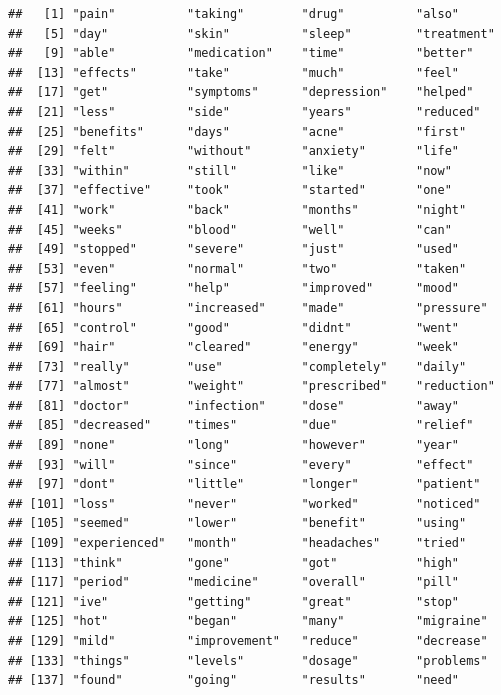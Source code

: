 \documentclass[spanish,]{article}
\begin{document}
\begin{verbatim}
##   [1] "pain"          "taking"        "drug"          "also"         
##   [5] "day"           "skin"          "sleep"         "treatment"    
##   [9] "able"          "medication"    "time"          "better"       
##  [13] "effects"       "take"          "much"          "feel"         
##  [17] "get"           "symptoms"      "depression"    "helped"       
##  [21] "less"          "side"          "years"         "reduced"      
##  [25] "benefits"      "days"          "acne"          "first"        
##  [29] "felt"          "without"       "anxiety"       "life"         
##  [33] "within"        "still"         "like"          "now"          
##  [37] "effective"     "took"          "started"       "one"          
##  [41] "work"          "back"          "months"        "night"        
##  [45] "weeks"         "blood"         "well"          "can"          
##  [49] "stopped"       "severe"        "just"          "used"         
##  [53] "even"          "normal"        "two"           "taken"        
##  [57] "feeling"       "help"          "improved"      "mood"         
##  [61] "hours"         "increased"     "made"          "pressure"     
##  [65] "control"       "good"          "didnt"         "went"         
##  [69] "hair"          "cleared"       "energy"        "week"         
##  [73] "really"        "use"           "completely"    "daily"        
##  [77] "almost"        "weight"        "prescribed"    "reduction"    
##  [81] "doctor"        "infection"     "dose"          "away"         
##  [85] "decreased"     "times"         "due"           "relief"       
##  [89] "none"          "long"          "however"       "year"         
##  [93] "will"          "since"         "every"         "effect"       
##  [97] "dont"          "little"        "longer"        "patient"      
## [101] "loss"          "never"         "worked"        "noticed"      
## [105] "seemed"        "lower"         "benefit"       "using"        
## [109] "experienced"   "month"         "headaches"     "tried"        
## [113] "think"         "gone"          "got"           "high"         
## [117] "period"        "medicine"      "overall"       "pill"         
## [121] "ive"           "getting"       "great"         "stop"         
## [125] "hot"           "began"         "many"          "migraine"     
## [129] "mild"          "improvement"   "reduce"        "decrease"     
## [133] "things"        "levels"        "dosage"        "problems"     
## [137] "found"         "going"         "results"       "need"         

\end{verbatim}
\end{document}
